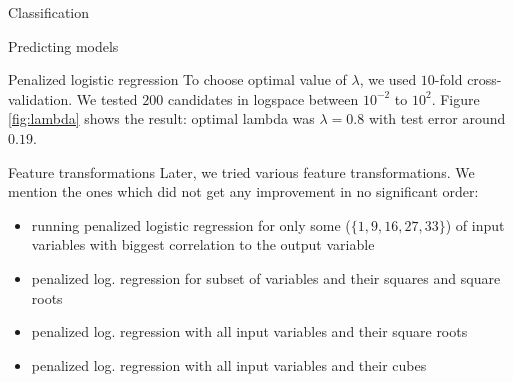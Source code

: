 \documentclass{article}
\begin{document}
\begin{section}{Classification}
\begin{subsection}{Predicting models}
\begin{subsubsection}{Penalized logistic regression}
To choose optimal value of $\lambda$, we used $10$-fold cross-validation. We tested $200$ candidates in logspace between $10^{-2}$ to $10^2$. Figure \ref{fig:lambda} shows the result: optimal lambda was $\lambda = 0.8$ with test error around $0.19$.

\begin{figure}[!t]
\center

\hfill
{}
\caption{}
\end{figure}

\begin{subsubsection}{Feature transformations}
Later, we tried various feature transformations. We mention the ones which did not get any improvement in no significant order:
\begin{itemize}

\item running penalized logistic regression for only some ($\{1, 9, 16, 27, 33\}$) of input variables with biggest correlation to the output variable
\item penalized log. regression for subset of variables and their squares and square roots
\item penalized log. regression with all input variables and their square roots
\item penalized log. regression with all input variables and their cubes
\end{itemize}


\end{subsubsection}
\end{subsubsection}
\end{subsection}
\end{section}
\end{document}
